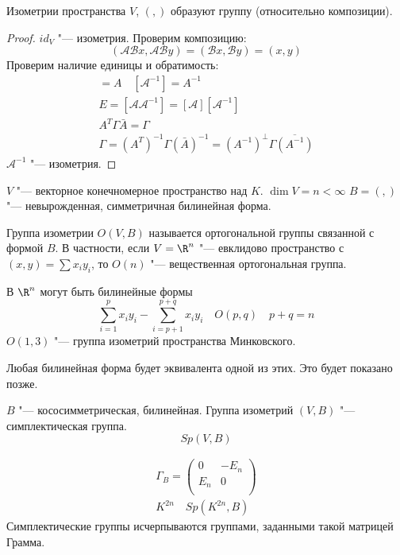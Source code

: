 \begin{conseq}
	Изометрии пространства $V$, $(,)$ образуют группу (относительно композиции).
\end{conseq}
\begin{proof}
	$id_V $  "--- изометрия.
	Проверим композицию:
	\[ (\mathcal A \mathcal B x, \mathcal A \mathcal B y) = (\mathcal B x, \mathcal B y) = (x, y) \]
	Проверим наличие единицы и обратимость:
	\begin{gather*}
		[\mathcal A ] = A \quad [\mathcal A ^{-1}] = A ^{-1} \\
		E = [\mathcal A \mathcal A ^{-1}] = [\mathcal A] [\mathcal A ^{-1}] \\
		A^T \Gamma \bar A  = \Gamma \\
		\Gamma = (A^T)^{-1} \Gamma (\bar A)^{-1} = (A^{-1})^\bot \Gamma \overline{(A^{-1})}
	\end{gather*}
	$\mathcal A^{-1}$ "--- изометрия.
\end{proof}

\begin{Def}
	$V$ "--- векторное конечномерное пространство над $K$. $\dim V = n < \infty$
	$B = (,)$ "--- невырожденная, симметричная билинейная форма.

	Группа изометрии $O(V, B)$ называется ортогональной группы связанной с формой $B$.
	В частности, если $V = \R^n$ "--- евклидово пространство с $(x, y) = \sum x_i y_i$,
	то $O(n)$ "--- вещественная ортогональная группа.
\end{Def}
В $\R^n$ могут быть билинейные формы
\[ \sum_{i = 1}^p x_iy_i - \sum_{i = p + 1}^{p + q} x_i y_i \quad O(p, q) \quad p + q = n \]
$O(1, 3)$ "--- группа изометрий пространства Минковского.

Любая билинейная форма будет эквивалента одной из этих.
Это будет показано позже.

\begin{Def}
	$B$ "--- кососимметрическая, билинейная.
	Группа изометрий $(V, B)$ "--- симплектическая группа.
	\[ Sp(V, B) \]
\end{Def}

\begin{exmp}
	\begin{gather*}
		\Gamma_B = \begin{pmatrix} 0 & -E_n \\ E_n & 0 \\ \end{pmatrix} \\
		K^{2n} \quad Sp(K^{2n}, B)
	\end{gather*}
	Симплектические группы исчерпываются группами, заданными такой матрицей Грамма.
\end{exmp}

